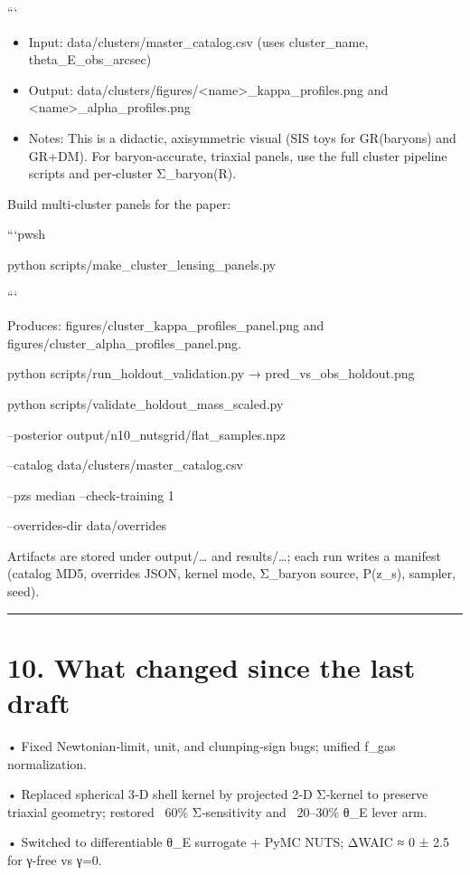 \documentclass[11pt,a4paper]{article}
\begin{document}
```


\begin{itemize}
\item Input: data/clusters/master\_catalog.csv (uses cluster\_name, theta\_E\_obs\_arcsec)
\item Output: data/clusters/figures/<name>\_kappa\_profiles.png and <name>\_alpha\_profiles.png
\item Notes: This is a didactic, axisymmetric visual (SIS toys for GR(baryons) and GR+DM). For baryon‑accurate, triaxial panels, use the full cluster pipeline scripts and per‑cluster Σ\_baryon(R).
\end{itemize}


Build multi‑cluster panels for the paper:


```pwsh

python scripts/make\_cluster\_lensing\_panels.py

```


Produces: figures/cluster\_kappa\_profiles\_panel.png and figures/cluster\_alpha\_profiles\_panel.png.


python scripts/run\_holdout\_validation.py → pred\_vs\_obs\_holdout.png  

python scripts/validate\_holdout\_mass\_scaled.py \

  --posterior output/n10\_nutsgrid/flat\_samples.npz \

  --catalog data/clusters/master\_catalog.csv \

  --pzs median --check-training 1 \

  --overrides-dir data/overrides


Artifacts are stored under output/… and results/…; each run writes a manifest (catalog MD5, overrides JSON, kernel mode, Σ\_baryon source, P(z\_s), sampler, seed).


\medskip\hrule\medskip


\section{10. What changed since the last draft}


• Fixed Newtonian‑limit, unit, and clumping‑sign bugs; unified f\_gas normalization.  

• Replaced spherical 3‑D shell kernel by projected 2‑D Σ‑kernel to preserve triaxial geometry; restored ~60\% Σ‑sensitivity and ~20–30\% θ\_E lever arm.  

• Switched to differentiable θ\_E surrogate + PyMC NUTS; ΔWAIC ≈ 0 ± 2.5 for γ‑free vs γ=0.  
\end{document}
